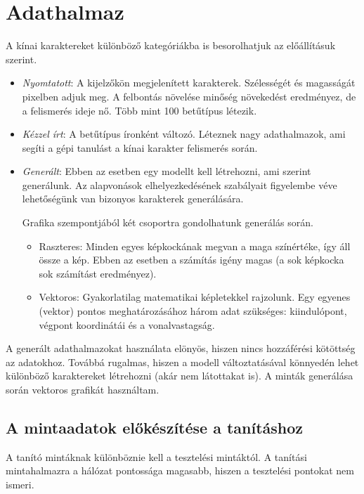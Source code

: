 
\section{Adathalmaz}

A kínai karaktereket különböző kategóriákba is besorolhatjuk az előállításuk szerint.
\begin{itemize}
\item \textit{Nyomtatott}: A kijelzőkön megjelenített karakterek. Szélességét és magasságát pixelben adjuk meg. A felbontás növelése minőség növekedést eredményez, de a felismerés ideje nő. Több mint 100 betűtípus létezik.
\item \textit{Kézzel írt}: A betűtípus íronként változó. Léteznek nagy adathalmazok, ami segíti a gépi tanulást a kínai karakter felismerés során.
\item \textit{Generált}: Ebben az esetben egy modellt kell létrehozni, ami szerint generálunk. Az alapvonások elhelyezkedésének szabályait figyelembe véve lehetőségünk van bizonyos karakterek generálására.

Grafika szempontjából két csoportra gondolhatunk generálás során.
	\begin{itemize}
	\item Raszteres: Minden egyes képkockának megvan a maga színértéke, így áll össze a kép. Ebben az esetben a számítás igény magas (a sok képkocka sok számítást eredményez).
	\item Vektoros: Gyakorlatilag matematikai képletekkel rajzolunk. Egy egyenes (vektor) pontos meghatározásához három adat szükséges: kiindulópont, végpont koordinátái és a vonalvastagság.
	\end{itemize}
\end{itemize}

A generált adathalmazokat használata elönyös, hiszen nincs hozzáférési kötöttség az adatokhoz. Továbbá rugalmas, hiszen a modell változtatásával könnyedén lehet különböző karaktereket létrehozni (akár nem látottakat is). A minták generálása során vektoros grafikát használtam.

\subsection{A mintaadatok előkészítése a tanításhoz}

A tanító mintáknak különböznie kell a tesztelési mintáktól. A tanítási mintahalmazra a hálózat pontossága magasabb, hiszen a tesztelési pontokat nem ismeri.

